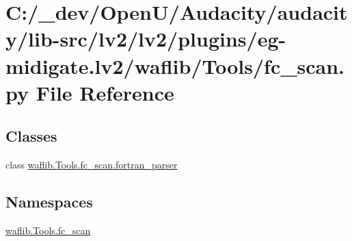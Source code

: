 \hypertarget{lv2_2plugins_2eg-midigate_8lv2_2waflib_2_tools_2fc__scan_8py}{}\section{C\+:/\+\_\+dev/\+Open\+U/\+Audacity/audacity/lib-\/src/lv2/lv2/plugins/eg-\/midigate.lv2/waflib/\+Tools/fc\+\_\+scan.py File Reference}
\label{lv2_2plugins_2eg-midigate_8lv2_2waflib_2_tools_2fc__scan_8py}
\subsection*{Classes}
\begin{DoxyCompactItemize}
\item 
class \hyperlink{classwaflib_1_1_tools_1_1fc__scan_1_1fortran__parser}{waflib.\+Tools.\+fc\+\_\+scan.\+fortran\+\_\+parser}
\end{DoxyCompactItemize}
\subsection*{Namespaces}
\begin{DoxyCompactItemize}
\item 
 \hyperlink{namespacewaflib_1_1_tools_1_1fc__scan}{waflib.\+Tools.\+fc\+\_\+scan}
\end{DoxyCompactItemize}

